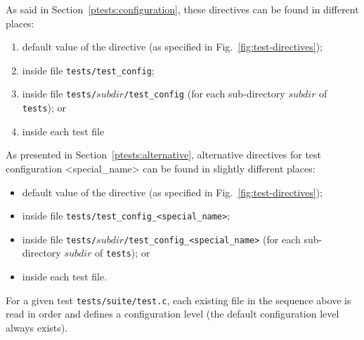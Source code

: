 As said in Section~\ref{ptests:configuration}, these directives can be
found in different places:
\begin{enumerate}
\item default value of the directive (as specified in
  Fig.~\ref{fig:test-directives});
\item inside file \texttt{tests/test\_config};
\item inside file \texttt{tests/$subdir$/test\_config} (for each sub-directory
  $subdir$ of \texttt{tests}); or
\item inside each test file
\end{enumerate}
As presented in Section~\ref{ptests:alternative}, alternative directives for
test configuration <special\_name> can be found in slightly different places:
\begin{itemize}
\item default value of the directive (as specified in
  Fig.~\ref{fig:test-directives});
\item inside file \texttt{tests/test\_config\_<special\_name>};
\item inside file \texttt{tests/$subdir$/test\_config\_<special\_name>} (for each sub-directory
  $subdir$ of \texttt{tests}); or
\item inside each test file.
\end{itemize}
For a given test \texttt{tests/suite/test.c}, each existing file in
the sequence above is read in order and defines a configuration level
(the default configuration level always exists).

